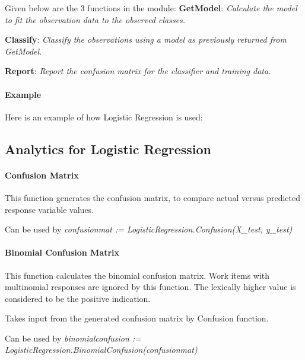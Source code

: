 Given below are the 3 functions in the module:
\textbf{GetModel}: \textit{Calculate the model to fit the observation data to the observed classes.}

\textbf{Classify}: \textit{Classify the observations using a model as previously returned from GetModel.}

\textbf{Report}: \textit{Report the confusion matrix for the classifier and training data.}

\paragraph{Example}

Here is an example of how Logistic Regression is used:



\subsection{Analytics for Logistic Regression}

\paragraph{Confusion Matrix}

This function generates the confusion matrix, to compare actual versus predicted response variable values.

Can be used by \textit{confusionmat := LogisticRegression.Confusion(X\_test, y\_test)}

\paragraph{Binomial Confusion Matrix}

This function calculates the binomial confusion matrix. Work items with multinomial responses are ignored by this function. The lexically higher value is considered to be the positive indication.

Takes input from the generated confusion matrix by Confusion function.

Can be used by \textit{binomialconfusion := LogisticRegression.BinomialConfusion(confusionmat)}


